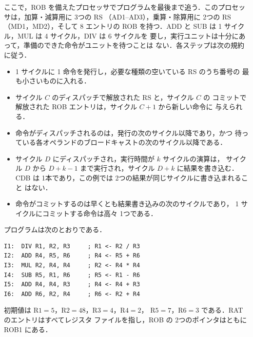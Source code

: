 \documentclass[../main.tex]{subfiles}
\begin{document}
ここで，ROB を備えたプロセッサでプログラムを最後まで追う．このプロセッサは，加算・減算用に 3つの RS
（AD1--AD3），乗算・除算用に 2つの RS（MD1，MD2），そして 8 エントリの ROB
を持つ．ADD と SUB は 1 サイクル，MUL は 4 サイクル，DIV は 6 サイクルを
要し，実行ユニットは十分にあって，準備のできた命令がユニットを待つことは
ない．各ステップは次の規約に従う．
\begin{itemize}
  \item 1 サイクルに 1 命令を発行し，必要な種類の空いている RS のうち番号の
    最も小さいものに入れる．
  \item サイクル $C$ のディスパッチで解放された RS と，サイクル $C$ の
    コミットで解放された ROB エントリは，サイクル $C+1$ から新しい命令に
    与えられる．
  \item 命令がディスパッチされるのは，発行の次のサイクル以降であり，かつ
    待っている各オペランドのブロードキャストの次のサイクル以降である．
  \item サイクル $D$ にディスパッチされ，実行時間が $k$ サイクルの演算は，
    サイクル $D$ から $D+k-1$ まで実行され，サイクル $D+k$ に結果を書き込む．
    CDB は 1本であり，この例では 2つの結果が同じサイクルに書き込まれること
    はない．
  \item 命令がコミットするのは早くとも結果書き込みの次のサイクルであり，
    1 サイクルにコミットする命令は高々 1つである．
\end{itemize}

\begin{example}
  \label{ex:l08-trace}
  プログラムは次のとおりである．
  \begin{lstlisting}[language={[x86masm]Assembler}, numbers=none]
I1:  DIV R1, R2, R3     ; R1 <- R2 / R3
I2:  ADD R4, R5, R6     ; R4 <- R5 + R6
I3:  MUL R2, R4, R4     ; R2 <- R4 * R4
I4:  SUB R5, R1, R6     ; R5 <- R1 - R6
I5:  ADD R4, R4, R3     ; R4 <- R4 + R3
I6:  ADD R6, R2, R4     ; R6 <- R2 + R4
\end{lstlisting}
  初期値は $\text{R1}=5$，$\text{R2}=48$，$\text{R3}=4$，$\text{R4}=2$，
  $\text{R5}=7$，$\text{R6}=3$ である．RAT のエントリはすべてレジスタ
  ファイルを指し，ROB の 2つのポインタはともに ROB1 にある．
\end{example}
\end{document}
